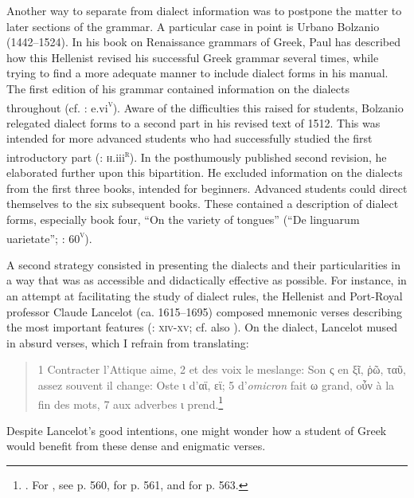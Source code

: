 Another way to separate  from dialect information was to postpone the matter to later sections of the grammar. A particular case in point is Urbano Bolzanio (1442–1524). In his book on Renaissance grammars of Greek, Paul \citet[36--40]{Botley2010} has described how this  Hellenist revised his successful Greek grammar several times, while trying to find a more adequate manner to include dialect forms in his manual. The first edition of his grammar contained information on the dialects throughout (cf. \citealt{Bolzanio1497}: e.vi\textsc{\textsuperscript{v}}). Aware of the difficulties this raised for students, Bolzanio relegated dialect forms to a second part in his revised text of 1512. This was intended for more advanced students who had successfully studied the first introductory part (\citealt{Bolzanio1512}: \textsc{h}.iii\textsc{\textsuperscript{r}}). In the posthumously published second revision, he elaborated further upon this bipartition. He excluded information on the dialects from the first three books, intended for beginners. Advanced students could direct themselves to the six subsequent books. These contained a description of dialect forms, especially book four, “On the variety of tongues” (“De linguarum uarietate”; \citealt{Bolzanio1545}: 60\textsc{\textsuperscript{v}}).

A second strategy consisted in presenting the dialects and their particularities in a way that was as accessible and didactically effective as possible. For instance, in an attempt at facilitating the study of dialect rules, the  Hellenist and Port-Royal professor Claude Lancelot (ca. 1615–1695) composed mnemonic verses describing the most important features (\citealt{Lancelot1655}: \textsc{xiv-xv;} cf. also \citealt{Anon.1725}). On the  dialect, Lancelot mused in absurd  verses, which I refrain from translating:

\begin{quote}\raggedright
1 Contracter l’Attique aime, 2 et des voix le meslange: Son ς en ξῖ, ῥῶ, ταῦ, assez souvent il change: Oste ι d’αϊ, εϊ; 5 d’\textit{omicron} fait ω grand, oὖν à la fin des mots, 7 aux adverbes ι prend.\footnote{\citet[558]{Lancelot1655}. For , see p. 560, for  p. 561, and for  p. 563.}
\end{quote}

Despite Lancelot’s good intentions, one might wonder how a student of Greek would benefit from these dense and enigmatic verses.

